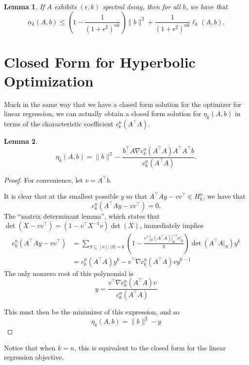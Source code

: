 \documentclass[a4paper]{article}
\newtheorem{lemma}{Lemma}
\begin{document}
\begin{lemma}
    If $A$ exhibits $(\epsilon, k)$ spectral decay, then for all $b$, we have that 
    \[
        \alpha_k(A, b) \le (1-\frac{1}{(1+\epsilon^2)^{nk}}) \|b\|^2 + \frac{1}{(1+\epsilon^2)^{nk}}\ell_k(A, b).
    \]
\end{lemma}


\section{Closed Form for Hyperbolic Optimization}
Much in the same way that we have a closed form solution for the optimizer for linear regression, we can actually obtain a closed form solution for $\eta_k(A, b)$ in terms of the characteristic coefficient $c_k^n(A^{\intercal}A)$.
\begin{lemma}
    \[
        \eta_k(A, b) = \|b\|^2 - \frac{b^{\intercal} A\nabla c_k^n(A^{\intercal}A)A^{\intercal} A^{\intercal}b}{c_k^n(A^{\intercal}A)}.
    \]
\end{lemma}
\begin{proof}
    For convenience, let $v = A^{\intercal}b$.

    It is clear that at the smallest possible $y$ so that $A^{\intercal}Ay - vv^{\intercal} \in H^n_k$, we have that 
    \[
        c_k^n(A^{\intercal}Ay - vv^{\intercal}) = 0.
    \]
    The ``matrix determinant lemma'', which states that $\det(X - vv^{\intercal}) = (1-v^{\intercal}X^{-1}v)\det(X)$, immediately implies
    \begin{align*}
        c_k^n(A^{\intercal}Ay - vv^{\intercal}) &= \sum_{S \subseteq [n] : |S| = k}(1-\frac{v^{\intercal}|_S(A^{\intercal}A)|_S^{-1}v|_S}{y})\det(A^{\intercal}A|_S)y^k\\
                                              &= c_k^n(A^{\intercal}A)y^k - v^{\intercal}\nabla c_k^n(A^{\intercal}A) vy^{k-1}
    \end{align*}
    The only nonzero root of this polynomial is
    \[
        y = \frac{v^{\intercal}\nabla c_k^n(A^{\intercal}A) v}{c_k^n(A^{\intercal}A)}
    \]

    This must then be the minimizer of this expression, and so 
    \[
        \eta_k(A, b) = \|b\|^2 - y
    \]
\end{proof}
Notice that when $k = n$, this is equivalent to the closed form for the linear regression objective.
\end{document}
